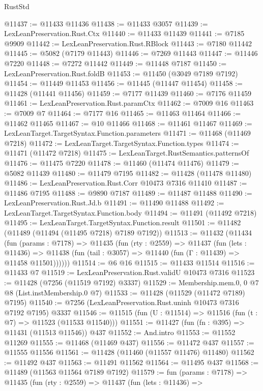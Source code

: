 \begin{lexlean}{RustStd}
\begin{coremodule}
@11437 := @11433 @11436
@11438 := @11433 @3057
@11439 := LexLeanPreservation.Rust.Ctx
@11440 := @11433 @11439
@11441 := @7185 @9909
@11442 := LexLeanPreservation.Rust.RBlock
@11443 := @7180 @11442
@11445 := @5082 (@7179 @11443)
@11446 := @7269 @11443
@11447 := @11446 @7220
@11448 := @7272 @11442
@11449 := @11448 @7187
@11450 := LexLeanPreservation.Rust.foldB
@11453 := @11450 (@3049 @7189 @7192)
@11454 := @11449 @11453
@11456 := @11445 (@11447 @11454)
@11458 := @11428 (@11441 @11456)
@11459 := @7177 @11439
@11460 := @7176 @11459
@11461 := LexLeanPreservation.Rust.paramCtx
@11462 := @7009 @16
@11463 := @7009 @7
@11464 := @7177 @16
@11465 := @11463 @11464
@11466 := @11462 @11465
@11467 := @10 @11466
@11468 := @11461 @11467
@11469 := LexLeanTarget.TargetSyntax.Function.parameters
@11471 := @11468 (@11469 @7218)
@11472 := LexLeanTarget.TargetSyntax.Function.types
@11474 := @11471 (@11472 @7218)
@11475 := LexLeanTarget.RustSemantics.patternsOf
@11476 := @11475 @7220
@11478 := @11460 (@11474 @11476)
@11479 := @5082 @11439
@11480 := @11479 @7195
@11482 := @11428 (@11478 @11480)
@11486 := LexLeanPreservation.Rust.Corr @10473 @7316 @11410
@11487 := @11486 @7195
@11488 := @9890 @7187
@11489 := @11487 @11488
@11490 := LexLeanPreservation.Rust.Jd.b
@11491 := @11490 @11488
@11492 := LexLeanTarget.TargetSyntax.Function.body
@11494 := @11491 (@11492 @7218)
@11495 := LexLeanTarget.TargetSyntax.Function.result
@11501 := @11482 (@11489 (@11494 (@11495 @7218) @7189 @7192))
@11513 := @11432
    (@11434
      (fun (params : @7178) =>
      @11435
        (fun (rty : @2559) =>
        @11437
          (fun (lets : @11436) =>
          @11438 (fun (tail : @3057) => @11440 (fun (Γ : @11439) => @11458 @11501))))))
@11514 := @6 @16
@11515 := @11433 @11514
@11516 := @11433 @7
@11519 := LexLeanPreservation.Rust.validU @10473 @7316
@11523 := @11428 (@7256 (@11519 @7192) @3337)
@11529 := Membership.mem.{0, 0} @7 @8 (List.instMembership.{0} @7)
@11533 := @11428 (@11529 (@11472 @7189) @7195)
@11540 := @7256 (LexLeanPreservation.Rust.uninh @10473 @7316 @7192 @7195) @3337
@11546 := @11515 (fun (U : @11514) => @11516 (fun (t : @7) => @11523 (@11533 @11540)))
@11551 := @11427 (fun (fn : @395) => @11431 (@11513 @11546)) @437
@11552 := And.intro
@11553 := @11552 @11269
@11555 := @11468 (@11469 @437)
@11556 := @11472 @437
@11557 := @11555 @11556
@11561 := @11428 (@11460 (@11557 @11476) @11480)
@11562 := @11492 @437
@11563 := @11491 @11562
@11564 := @11495 @437
@11568 := @11489 (@11563 @11564 @7189 @7192)
@11579 := fun (params : @7178) =>
  @11435
    (fun (rty : @2559) =>
    @11437
      (fun (lets : @11436) =>

\end{coremodule}
\end{lexlean}
